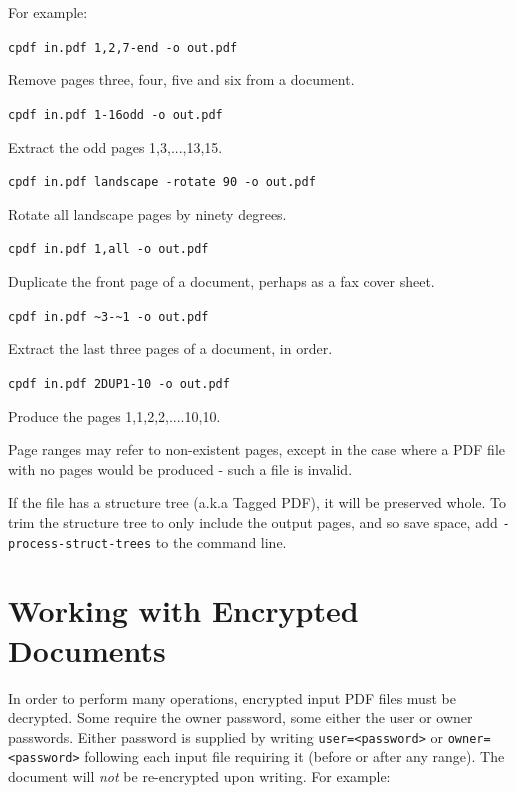 \documentclass{book}
\begin{document}
  \noindent For example:
  \begin{framed}
  \noindent\small\verb!cpdf in.pdf 1,2,7-end -o out.pdf!

  \vspace{2.5mm}
  \noindent Remove pages three, four, five and six from a document.

  \vspace{2.5mm}
  \noindent\verb!cpdf in.pdf 1-16odd -o out.pdf!

  \vspace{2.5mm}
  \noindent Extract the odd pages 1,3,...,13,15.
  
  \vspace{2.5mm}
  \noindent\verb!cpdf in.pdf landscape -rotate 90 -o out.pdf!

  \vspace{2.5mm}
  \noindent Rotate all landscape pages by ninety degrees.
    
  \vspace{2.5mm}
  \noindent\verb!cpdf in.pdf 1,all -o out.pdf!

  \vspace{2.5mm}
  \noindent Duplicate the front page of a document, perhaps as a fax cover sheet.

  \vspace{2.5mm}
  \noindent\verb!cpdf in.pdf ~3-~1 -o out.pdf!

  \vspace{2.5mm}
  \noindent Extract the last three pages of a document, in order.

  \vspace{2.5mm}
  \noindent\verb!cpdf in.pdf 2DUP1-10 -o out.pdf!

  \vspace{2.5mm}
  \noindent Produce the pages 1,1,2,2,....10,10.

  \end{framed}


\noindent Page ranges may refer to non-existent pages, except in the case where a PDF file with no pages would be produced - such a file is invalid.

If the file has a structure tree (a.k.a Tagged PDF), it will be preserved whole. To trim the structure tree to only include the output pages, and so save space, add \texttt{-process-struct-trees} to the command line.

  \section{Working with Encrypted Documents}
  In order to perform many operations, encrypted input PDF files must be
decrypted. Some require the owner password, some either the user or owner
passwords. Either password is supplied by writing \texttt{user=<password>} or
\texttt{owner=<password>} following each input file requiring it (before or
after any range). The document will \textit{not} be re-encrypted upon writing.  For
example:
\end{document}
